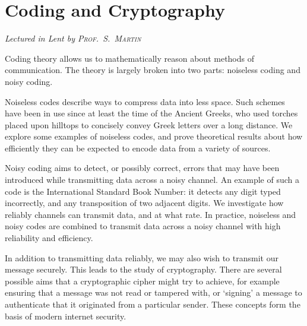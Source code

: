 \chapter[Coding and Cryptography \\ \textnormal{\emph{Lectured in Lent \oldstylenums{2023} by \textsc{Prof.\ S.\ Martin}}}]{Coding and Cryptography}
\emph{\Large Lectured in Lent  by \textsc{Prof.\ S.\ Martin}}

Coding theory allows us to mathematically reason about methods of communication.
The theory is largely broken into two parts: noiseless coding and noisy coding.

Noiseless codes describe ways to compress data into less space.
Such schemes have been in use since at least the time of the Ancient Greeks, who used torches placed upon hilltops to concisely convey Greek letters over a long distance.
We explore some examples of noiseless codes, and prove theoretical results about how efficiently they can be expected to encode data from a variety of sources.

Noisy coding aims to detect, or possibly correct, errors that may have been introduced while transmitting data across a noisy channel.
An example of such a code is the International Standard Book Number: it detects any digit typed incorrectly, and any transposition of two adjacent digits.
We investigate how reliably channels can transmit data, and at what rate.
In practice, noiseless and noisy codes are combined to transmit data across a noisy channel with high reliability and efficiency.

In addition to transmitting data reliably, we may also wish to transmit our message securely.
This leads to the study of cryptography.
There are several possible aims that a cryptographic cipher might try to achieve, for example ensuring that a message was not read or tampered with, or `signing' a message to authenticate that it originated from a particular sender.
These concepts form the basis of modern internet security.


